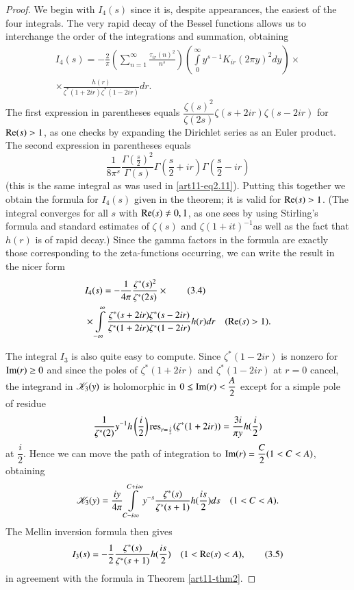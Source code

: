 \begin{proof}
We begin with $I_4 (s)$ since it is, despite appearances, the easiest of the four integrals. The very rapid decay of the Bessel functions allows us to interchange the order of the integrations and summation, obtaining 
\begin{gather*}
I_4 (s) = - \frac{2}{\pi} \left(\sum\limits^\infty_{n =1} \frac{\tau_{ir} (n)^2}{n^s} \right) \left(\int\limits^\infty_0 y^{s-1} K_{ir} (2 \pi y)^2 dy  \right) \times\\
\times \frac{h(r)}{\zeta^\ast (1+ 2ir) \zeta^\ast (1-2ir)}  dr. 
\end{gather*}
The first expression in parentheses equals $\dfrac{\zeta(s)^2}{\zeta(2s)} \zeta (s + 2ir) \zeta(s-2 ir)$ for $\operatorname{Re} (s) >1$, as one checks by expanding the Dirichlet series as an Euler product. The second expression in parentheses equals 
$$
\dfrac{1}{8 \pi^s} \dfrac{\Gamma \left(\frac{s}{2} \right)^2}{\Gamma (s)} \Gamma \left(\frac{s}{2} + ir \right) \Gamma \left(\frac{s}{2}  - ir \right)
$$  
(this is the same integral as was used in \eqref{art11-eq2.11}). Putting this together we obtain the formula for $I_4 (s)$ given in the theorem; it is valid for $\operatorname{Re} (s) >1$. (The integral converges for all $s$ with $\operatorname{Re} (s) \neq 0, 1$, as one sees by using Stirling's formula and standard estimates of $\zeta(s)$ and $\zeta(1+it)^{-1}$\pageoriginale as well as the fact that $h(r)$ is of rapid decay.) Since the gamma factors in the formula are exactly those corresponding to the zeta-functions occurring, we can write the result in the nicer form 
\begin{align*} 
& I_4 (s)  = - \frac{1}{4 \pi} \frac{\zeta^\ast (s)^2}{\zeta^\ast (2s)} \times \tag{3.4}\label{art11-eq3.4}\\
& \times \int\limits^\infty_{-\infty} \frac{\zeta^\ast (s+2 ir) \zeta^\ast (s - 2 ir)}{\zeta^\ast (1+ 2 ir) \zeta^\ast (1-2ir)} h(r) dr \quad (\operatorname{Re} (s) >1). 
\end{align*}

The integral $I_3$ is also quite easy to compute. Since $\zeta^\ast (1 - 2 ir)$ is nonzero for $\operatorname{Im} (r)\geq 0$ and since the poles of $\zeta^\ast (1+ 2 ir)$ and $\zeta^\ast (1-2ir)$ at $r =0$ cancel, the integrand in $\mathscr{K}_3 (y)$ is holomorphic in $0 \leq \operatorname{Im} (r) < \dfrac{A}{2}$ except for a simple pole of residue 
$$
\frac{1}{\zeta^\ast (2)} y^{-1} h \left( \frac{i}{2}\right) \mathrm{res}_{r = \frac{i}{2}} (\zeta^\ast (1+ 2 ir)) = \frac{3 i}{\pi y} h (\frac{i}{2})
$$
at $\dfrac{i}{2}$. Hence we can move the path of integration to $\operatorname{Im} (r) = \dfrac{C}{2} (1 < C < A)$, obtaining 
$$
\mathscr{K}_3 (y) = \frac{iy}{4 \pi} \int\limits^{C + i \infty}_{C - i \infty}  y^{-s} \frac{\zeta^\ast(s)}{\zeta^\ast(s+1)} h (\frac{is}{2}) ds \quad (1 < C < A). 
$$
The Mellin inversion formula then gives 
\begin{equation*}
I_3 (s) = -\frac{1}{2} \frac{\zeta^\ast (s)}{\zeta^\ast (s+1)} h (\frac{is}{2}) \quad (1< \operatorname{Re} (s) < A), \tag{3.5}\label{art11-eq3.5}
\end{equation*}
in agreement with the formula in Theorem \eqref{art11-thm2}. 


\end{proof}
